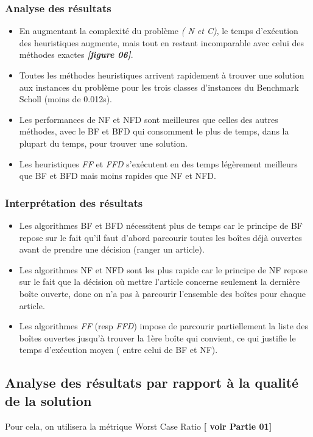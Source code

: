 \documentclass[class=article, crop=false]{standalone}
\begin{document}
\subsubsection{Analyse des résultats}
\begin{itemize}
    \item En augmentant la complexité du problème \emph{( N et C)}, le temps d'exécution des heuristiques augmente, mais tout en restant incomparable avec celui des méthodes exactes \textbf{\emph{[figure 06]}}.
    \item Toutes les méthodes heuristiques arrivent rapidement à trouver une solution aux instances du problème pour les trois classes d’instances du Benchmark Scholl (moins de 0.012s).
    \item Les performances de NF et NFD sont meilleures que celles des autres méthodes, avec le BF et BFD qui consomment le plus de temps, dans la plupart du temps, pour trouver une solution.
    \item Les heuristiques \emph{FF} et \emph{FFD} s’exécutent en des temps légèrement meilleurs que BF et BFD mais moins rapides que NF et NFD.
\end{itemize}

\subsubsection{Interprétation des résultats}
\begin{itemize}
    \item Les algorithmes BF et BFD nécessitent plus de temps car le principe de BF repose sur le fait qu’il faut d’abord parcourir toutes les boîtes déjà ouvertes avant de prendre une décision (ranger un article).
    \item Les algorithmes NF et NFD sont les plus rapide car le principe de NF repose sur le fait que la décision où mettre l’article concerne seulement la dernière boîte ouverte, donc on n’a pas à parcourir l’ensemble des boîtes pour chaque article.
    \item Les algorithmes \emph{FF} (resp \emph{FFD}) impose de parcourir partiellement la liste des boîtes ouvertes jusqu’à trouver la 1ère boîte qui convient, ce qui justifie le temps d’exécution moyen ( entre celui de BF et NF).
\end{itemize}

\subsection{Analyse des résultats par rapport à la qualité de la solution}
Pour cela, on utilisera la métrique Worst Case Ratio \textbf{[ voir Partie 01]} \\
\end{document}
